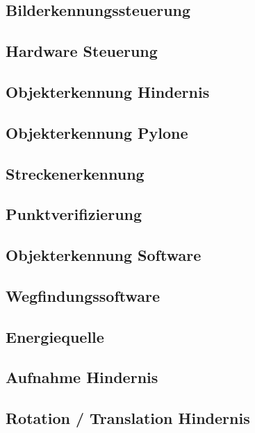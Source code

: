 \documentclass[../main.tex]{subfiles}
\begin{document}
\subsection{Bilderkennungssteuerung}


\subsection{Hardware Steuerung}


\subsection{Objekterkennung Hindernis}


\subsection{Objekterkennung Pylone}



\subsection{Streckenerkennung}


\subsection{Punktverifizierung}


\subsection{Objekterkennung Software}

\subsection{Wegfindungssoftware}


\subsection{Energiequelle}


\subsection{Aufnahme Hindernis}



\subsection{Rotation / Translation Hindernis}
\end{document}
